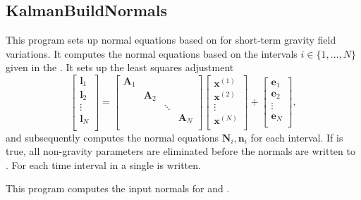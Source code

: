 \subsection{KalmanBuildNormals}\label{KalmanBuildNormals}
This program sets up normal equations based on 
for short-term gravity field variations.
It computes the normal equations based on the intervals $i \in \{1, ..., N\}$ given in the .
It sets up the least squares adjustment
\begin{equation}
    \begin{bmatrix}
    \mathbf{l}_1 \\
    \mathbf{l}_2 \\
    \vdots \\
    \mathbf{l}_N \\
  \end{bmatrix}
  =
  \begin{bmatrix}
    \mathbf{A}_1  &  & & \\
    & \mathbf{A}_2  & &\\
    &  & \ddots & \\
    & & & \mathbf{A}_N \\
  \end{bmatrix}
  \begin{bmatrix}
    \mathbf{x}^{(1)} \\
    \mathbf{x}^{(2)} \\
    \vdots \\
    \mathbf{x}^{(N)} \\
  \end{bmatrix}
  +
  \begin{bmatrix}
    \mathbf{e}_1 \\
    \mathbf{e}_2 \\
    \vdots \\
    \mathbf{e}_N \\
  \end{bmatrix},
\end{equation}
and subsequently computes the normal equations $\mathbf{N}_i, \mathbf{n}_i$ for each interval.
If  is true, all non-gravity parameters are eliminated before the normals
are written to .
For each time interval in  a single  is written.

This program computes the input normals for  and .


